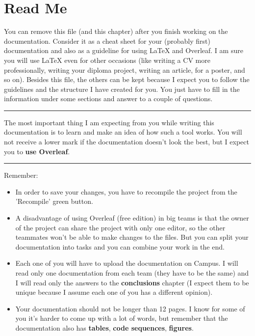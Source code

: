 \chapter{Read Me}

You can remove this file (and this chapter) after you finish working on the documentation. Consider it as a cheat sheet for your (probably first) documentation and also as a guideline for using \LaTeX{} and Overleaf. I am sure you will use \LaTeX{} even for other occasions (like writing a CV more professionally, writing your diploma project, writing an article, for a poster, and so on). Besides this file, the others can be kept because I expect you to follow the guidelines and the structure I have created for you. You just have to fill in the information under some sections and answer to a couple of questions.

\noindent
{\color{red} \rule{\linewidth}{0.5mm} }
The most important thing I am expecting from you while writing this documentation is to learn and make an idea of how such a tool works. You will not receive a lower mark if the documentation doesn't look the best, but I expect you to \textbf{use Overleaf}. 

\noindent
{\color{red} \rule{\linewidth}{0.5mm} }

Remember: 
\begin{itemize}
    \item In order to save your changes, you have to recompile the project from the 'Recompile' green button.
    
    \item A disadvantage of using Overleaf (free edition) in big teams is that the owner of the project can share the project with only one editor, so the other teammates won't be able to make changes to the files. But you can split your documentation into tasks and you can combine your work in the end.
    
    \item Each one of you will have to upload the documentation on Campus. I will read only one documentation from each team (they have to be the same) and I will read only the answers to the \textbf{conclusions} chapter (I expect them to be unique because I assume each one of you has a different opinion).
    
    \item Your documentation should not be longer than 12 pages. I know for some of you it's harder to come up with a lot of words, but remember that the documentation also has \textbf{tables}, \textbf{code sequences}, \textbf{figures}.
    
\end{itemize}

